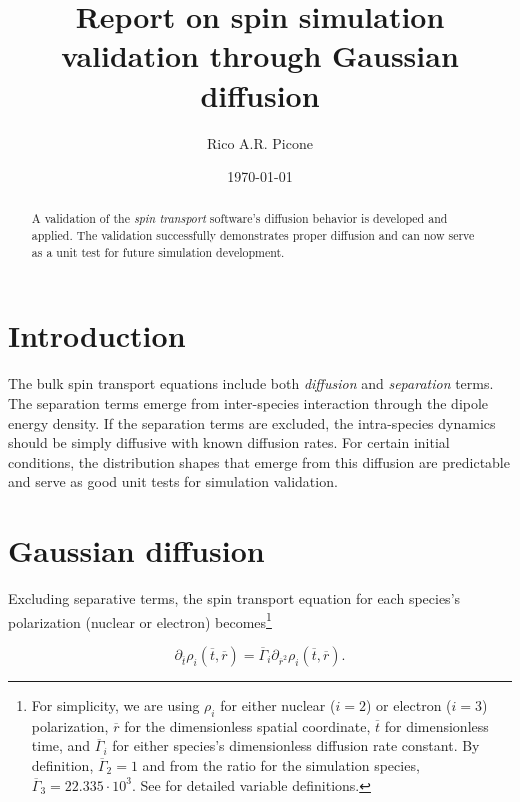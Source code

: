 \documentclass[onecolumn]{amsart}
\author{Rico A.R. Picone}
\date{\today}
\title{Report on spin simulation validation through Gaussian diffusion}
\begin{document}
\maketitle
\begin{abstract}
A validation of the \emph{spin transport} software's diffusion behavior is developed and applied.
The validation successfully demonstrates proper diffusion and can now serve as a unit test for future simulation development.
\end{abstract}

\section{Introduction}
\label{sec:org50cf7cc}
The bulk spin transport equations include both \emph{diffusion} and \emph{separation} terms.
The separation terms emerge from inter-species interaction through the dipole energy density.
If the separation terms are excluded, the intra-species dynamics should be simply diffusive with known diffusion rates.
For certain initial conditions, the distribution shapes that emerge from this diffusion are predictable and serve as good unit tests for simulation validation.

\section{Gaussian diffusion}
\label{sec:org96530b0}
Excluding separative terms, the spin transport equation for each species's polarization (nuclear or electron) becomes\footnote{For simplicity, we are using \(\rho_i\) for either nuclear (\(i=2\)) or electron (\(i=3\)) polarization, \(\overline{r}\) for the dimensionless spatial coordinate, \(\overline{t}\) for dimensionless time, and \(\overline{\Gamma}_i\) for either species's dimensionless diffusion rate constant. By definition, \(\overline{\Gamma}_2 = 1\) and from the ratio for the simulation species, \(\overline{\Gamma}_3 = 22.335 \cdot 10^{3}\). See \cite{Picone2014b,Picone2019} for detailed variable definitions.}

\begin{equation}
\label{eq:diffusion}
\partial_{\overline{t}} \rho_i(\overline{t},\overline{r}) =
\overline{\Gamma}_i \partial_{\overline{r}^2} \rho_i(\overline{t},\overline{r}).
\end{equation}
\end{document}

